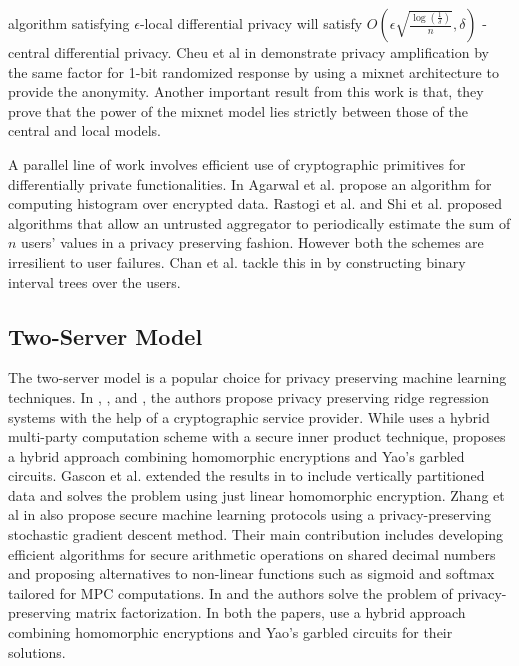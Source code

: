 algorithm satisfying $\epsilon$-local differential privacy will satisfy $O(\epsilon\sqrt{\frac{\log(\frac{1}{\delta})}{n}},\delta)$ -central differential
privacy. Cheu et al in \cite{mixnets} demonstrate privacy amplification by the same factor for 1-bit randomized response by using a mixnet architecture to provide the anonymity. Another important result from this work is that, they prove that the power of the mixnet model lies strictly between those of the central and local
models.
\par A parallel line of work involves efficient use of cryptographic primitives for differentially private
functionalities. In   Agarwal et al. propose an algorithm for computing histogram over encrypted data. Rastogi et al. \cite{Rastogi} and
Shi et al. \cite{Shi} proposed algorithms that allow an untrusted aggregator to periodically
estimate the sum of $n$ users' values in a  privacy preserving fashion. However both the schemes are irresilient to user failures. Chan et al. tackle this in \cite{Shi2} by constructing binary interval trees over the users.
\subsection{Two-Server Model}
The two-server model is a popular choice for privacy preserving machine learning techniques. In \cite{Boneh1}, \cite{LReg}, \cite{Ver} and \cite{Ridge2}, the authors propose privacy preserving ridge regression systems with the help of a cryptographic service provider. While \cite{Ridge2} uses a hybrid multi-party computation scheme with a secure inner product technique, \cite{Boneh1} proposes a hybrid approach combining homomorphic encryptions and Yao's garbled circuits. Gascon et al. \cite{Ver} extended the results in \cite{Boneh1} to include vertically partitioned data and \cite{LReg} solves the problem using just linear homomorphic encryption.  Zhang et al in \cite{secureML} also propose secure machine learning protocols using a privacy-preserving stochastic gradient descent method. Their main contribution includes developing efficient algorithms for secure arithmetic
operations on shared decimal numbers and proposing alternatives to non-linear
functions such as sigmoid and softmax tailored for MPC computations. 
In \cite{Boneh2} and \cite{Matrix2} the authors solve the problem of privacy-preserving matrix factorization. In both the papers, use a hybrid approach combining homomorphic encryptions and Yao's garbled circuits for their solutions. 

